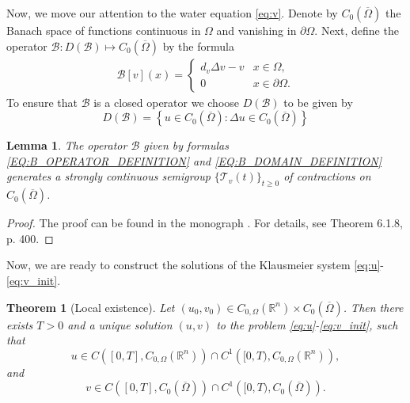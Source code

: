 \documentclass[12pt, a4paper]{article}
\theoremstyle{break}
\newtheorem{thm}{Theorem}[section]
\theoremstyle{break}
\theoremstyle{break}
\theoremstyle{break}
\theoremstyle{break}
\newtheorem{lem}{Lemma}[section]
\theoremstyle{break}
\theoremstyle{break}
\begin{document}
Now, we move our attention to the water equation \eqref{eq:v}. Denote by $C_0(\overline{\Omega})$ the Banach space of functions continuous in $\Omega$ and vanishing in $\partial\Omega$. Next, define the operator $\mathcal{B}: D(\mathcal{B}) \mapsto C_0(\overline{\Omega})$ by the formula
\begin{align}
    \label{EQ:B_OPERATOR_DEFINITION}
    \mathcal{B}[v](x) = 
    \begin{cases}
        d_v \Delta v - v &x \in \Omega, \\
        0 &x \in \partial \Omega.
    \end{cases}
\end{align}
To ensure that $\mathcal{B}$ is a closed operator we choose $D(\mathcal{B})$ to be given by
\begin{equation}
    \label{EQ:B_DOMAIN_DEFINITION}
    D(\mathcal{B}) = \left\{ u \in C_0(\overline{\Omega}): \Delta u \in C_0(\overline{\Omega}) \right\}
\end{equation}
\begin{lem}
    \label{lem:B_SEMIGROUP_GENERATOR}
    The operator $\mathcal{B}$ given by formulas \eqref{EQ:B_OPERATOR_DEFINITION} and \eqref{EQ:B_DOMAIN_DEFINITION} generates a strongly continuous semigroup $\{\mathcal{T}_v(t)\}_{t \geq 0}$ of contractions on $C_0(\overline{\Omega})$.
\end{lem}
\begin{proof}
    The proof can be found in the monograph \cite{Arendt2001}. For details, see Theorem 6.1.8, p. 400.
\end{proof}
Now, we are ready to construct the solutions of the Klausmeier system \eqref{eq:u}-\eqref{eq:v_init}.
\begin{thm}[Local existence]
    \label{thm:Well-Posedness}
    Let $(u_0, v_0) \in C_{0, \Omega}(\mathbb{R}^n) \times C_0(\overline{\Omega})$. Then there exists $T > 0$ and a unique solution $(u, v)$ to the problem \eqref{eq:u}-\eqref{eq:v_init}, such that
    \begin{equation}
        u \in C\left([0, T], C_{0, \Omega}(\mathbb{R}^n)\right) \cap C^1\left([0, T), C_{0, \Omega}(\mathbb{R}^n)\right),
    \end{equation}
    and
    \begin{equation}
        v \in C\left([0, T], C_0(\overline{\Omega})\right) \cap C^1\left([0, T), C_0(\overline{\Omega})\right).
    \end{equation}
\end{thm}
\end{document}
